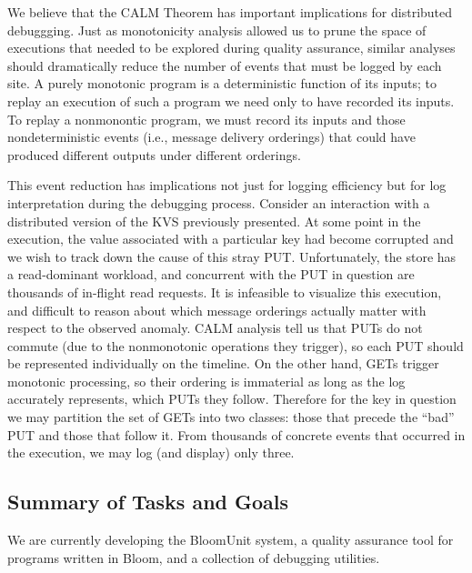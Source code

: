 We believe that the CALM Theorem has important implications for distributed debuggging.
Just as monotonicity analysis allowed us to prune the space of executions that needed to be
explored during quality assurance, similar analyses should dramatically reduce the number of events
that must be logged by each site.  A purely monotonic program is a deterministic function of its inputs;
to replay an execution of such a program we need only to have recorded its inputs.  To replay a nonmonontic 
program, we must record its inputs and those nondeterministic events (i.e., message delivery orderings) 
that could have produced different outputs under different orderings.  

This event reduction has implications not just for logging efficiency but for log interpretation during
the debugging process.  Consider an interaction with a distributed version of the KVS previously presented.
At some point in the execution, the value associated with a particular key had become corrupted and we wish
to track down the cause of this stray PUT.  Unfortunately, the store has a read-dominant workload, and concurrent 
with the PUT in question are thousands of in-flight read requests.  It is infeasible to visualize this execution,
and difficult to reason about which message orderings actually matter with respect to the observed anomaly.
CALM analysis tell us that PUTs do not commute (due to the nonmonotonic operations they trigger), so each PUT
should be represented individually on the timeline.  On the other hand, GETs trigger monotonic processing, so
their ordering is immaterial as long as the log accurately represents, which PUTs they follow.
Therefore for the key in question we may partition the set of GETs into two classes: those that precede the ``bad''
PUT and those that follow it.  From thousands of concrete events that occurred in the execution, we may log (and
display) only three.



\subsection{Summary of Tasks and Goals}

We are currently developing the BloomUnit system, a quality assurance tool
for programs written in Bloom, and a collection of debugging utilities.


